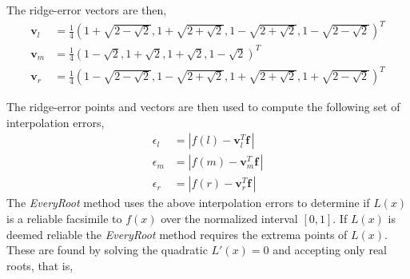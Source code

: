 The ridge-error vectors are then,
\begin{align}
\mathbf{v}_l &= \frac{1}{4}\left(1+\sqrt{2-\sqrt{2}}, 1+\sqrt{2+\sqrt{2}}, 1-\sqrt{2+\sqrt{2}}, 1-\sqrt{2-\sqrt{2}}\right)^T\\
\mathbf{v}_m &= \frac{1}{4}\left(1-\sqrt{2}, 1+\sqrt{2}, 1+\sqrt{2}, 1-\sqrt{2}\right)^T\\
\mathbf{v}_r &= \frac{1}{4}\left(1-\sqrt{2-\sqrt{2}}, 1-\sqrt{2+\sqrt{2}},1+\sqrt{2+\sqrt{2}}, 1+\sqrt{2-\sqrt{2}}\right)^T
\label{eq:RidgeErrorVectors}
\end{align}

The ridge-error points and vectors are then used to compute the following set of interpolation errors,
\begin{align}
\epsilon_l &= |f(l) - \mathbf{v}_l^T \mathbf{f}\,|\\
\epsilon_m &= |f(m) - \mathbf{v}_m^T \mathbf{f}\,|\\
\epsilon_r &= |f(r) - \mathbf{v}_r^T \mathbf{f}\,|
\label{eq:RidgeErrorValues}
\end{align}
The \emph{EveryRoot} method uses the above interpolation errors to determine if $L(x)$ is a reliable facsimile to $f(x)$ over the normalized interval $[0,1]$. If $L(x)$ is deemed reliable the \emph{EveryRoot} method requires the extrema points of $L(x)$. These are found by solving the quadratic $L'(x) = 0$ and accepting only real roots, that is,
